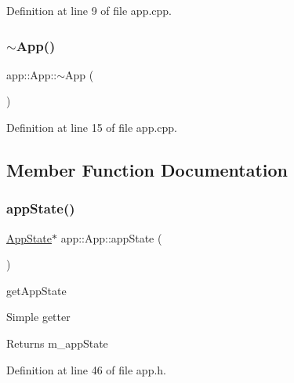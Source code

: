 Definition at line 9 of file app.\+cpp.

\mbox{\label{classapp_1_1_app_ac5e7d7e1bf46f87ea894830d8aa2cc08}} 
\subsubsection{\texorpdfstring{$\sim$\+App()}{~App()}}
{\footnotesize\ttfamily app\+::\+App\+::$\sim$\+App (\begin{DoxyParamCaption}{ }\end{DoxyParamCaption})}



Definition at line 15 of file app.\+cpp.



\subsection{Member Function Documentation}
\mbox{\label{classapp_1_1_app_a6bbccc1f287168e3514cd390aea73d50}} 
\subsubsection{\texorpdfstring{app\+State()}{appState()}}
{\footnotesize\ttfamily \mbox{\hyperlink{classapp_1_1_app_state}{App\+State}}$\ast$ app\+::\+App\+::app\+State (\begin{DoxyParamCaption}{ }\end{DoxyParamCaption})\hspace{0.3cm}{\ttfamily [inline]}}



get\+App\+State 

Simple getter \begin{DoxyReturn}{Returns}
m\+\_\+app\+State 
\end{DoxyReturn}


Definition at line 46 of file app.\+h.

\mbox{\label{classapp_1_1_app_aca8be846f8cd12968ccbefcc1ce43a4f}} 
